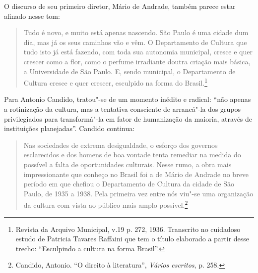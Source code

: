 O discurso de seu primeiro diretor, Mário de Andrade, também parece
estar afinado nesse tom:

\begin{quote}
Tudo é novo, e muito está apenas nascendo. São Paulo é uma cidade dum
dia, mas já os seus caminhos vão e vêm. O Departamento de Cultura que
tudo isto já está fazendo, com toda sua autonomia municipal, cresce e
quer crescer como a flor, como o perfume irradiante doutra criação mais
básica, a Universidade de São Paulo. E, sendo municipal, o Departamento
de Cultura cresce e quer crescer, esculpido na forma do
Brasil.\footnote{Revista da Arquivo Municipal, v.19 p. 272, 1936.
  Transcrito no cuidadoso estudo de Patricia Tavares Raffaini que tem o
  título elaborado a partir desse trecho: ``Esculpindo a cultura na
  forma Brasil''.}
\end{quote}

Para Antonio Candido, tratou"-se de um momento inédito e radical: ``não
apenas a rotinização da cultura, mas a tentativa consciente de
arrancá"-la dos grupos privilegiados para transformá"-la em fator de
humanização da maioria, através de instituições planejadas''. Candido
continua:

\begin{quote}
Nas sociedades de extrema desigualdade, o esforço dos governos
esclarecidos e dos homens de boa vontade tenta remediar na medida do
possível a falta de oportunidades culturais. Nesse rumo, a obra mais
impressionante que conheço no Brasil foi a de Mário de Andrade no breve
período em que chefiou o Departamento de Cultura da cidade de São Paulo,
de 1935 a 1938. Pela primeira vez entre nós viu"-se uma organização da
cultura com vista ao público mais amplo possível.\footnote{Candido,
  Antonio. ``O direito à literatura'', \emph{Vários escritos}, p. 258.}
\end{quote}

